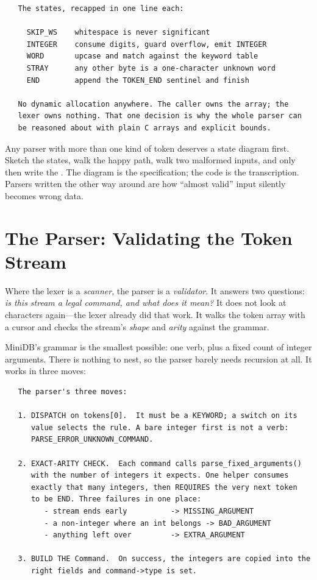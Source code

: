 \begin{verbatim}
   The states, recapped in one line each:

     SKIP_WS    whitespace is never significant
     INTEGER    consume digits, guard overflow, emit INTEGER
     WORD       upcase and match against the keyword table
     STRAY      any other byte is a one-character unknown word
     END        append the TOKEN_END sentinel and finish

   No dynamic allocation anywhere. The caller owns the array; the
   lexer owns nothing. That one decision is why the whole parser can
   be reasoned about with plain C arrays and explicit bounds.
\end{verbatim}

\begin{ruleofthumb}
Any parser with more than one kind of token deserves a state diagram
first. Sketch the states, walk the happy path, walk two malformed
inputs, and only then write the . The diagram is the
specification; the code is the transcription. Parsers written the
other way around are how ``almost valid'' input silently becomes
wrong data.
\end{ruleofthumb}

\section{The Parser: Validating the Token Stream}

Where the lexer is a \emph{scanner}, the parser is a \emph{validator}.
It answers two questions: \emph{is this stream a legal command, and
what does it mean?} It does not look at characters again---the lexer
already did that work. It walks the token array with a cursor and
checks the stream's \emph{shape} and \emph{arity} against the grammar.

MiniDB's grammar is the smallest possible: one verb, plus a fixed
count of integer arguments. There is nothing to nest, so the parser
barely needs recursion at all. It works in three moves:

\begin{verbatim}
   The parser's three moves:

   1. DISPATCH on tokens[0].  It must be a KEYWORD; a switch on its
      value selects the rule. A bare integer first is not a verb:
      PARSE_ERROR_UNKNOWN_COMMAND.

   2. EXACT-ARITY CHECK.  Each command calls parse_fixed_arguments()
      with the number of integers it expects. One helper consumes
      exactly that many integers, then REQUIRES the very next token
      to be END. Three failures in one place:
         - stream ends early          -> MISSING_ARGUMENT
         - a non-integer where an int belongs -> BAD_ARGUMENT
         - anything left over         -> EXTRA_ARGUMENT

   3. BUILD THE Command.  On success, the integers are copied into the
      right fields and command->type is set.
\end{verbatim}

